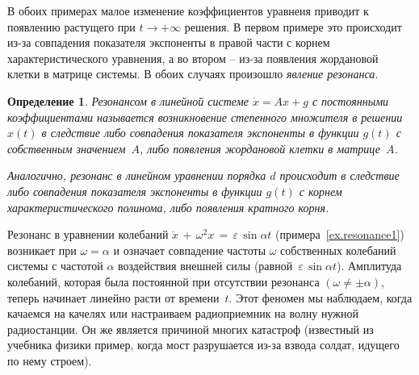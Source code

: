 \documentclass[12pt,a4paper]{article}
\newtheorem{defi}{Определение}
\begin{document}
В обоих примерах малое изменение коэффициентов уравнеия приводит к
появлению растущего при $t\to +\infty$ решения. В первом примере это происходит из-за совпадения
показателя экспоненты в правой части с корнем характеристического уравнения, а во втором -- из-за появления
жордановой клетки в матрице системы. В обоих случаях произошло {\em явление резонанса}.
\begin{defi}\label{d.resonance}
Резонансом в линейной системе $\dot x = Ax + g$ с постоянными коэффициентами называется возникновение степенного множителя в решении~$x(t)$ в следствие либо совпадения показателя экспоненты в функции $g(t)$ с собственным значением~$A$,
либо появления жордановой клетки в  матрице~$A$.

 Аналогично, резонанс в линейном уравнении порядка $d$
 происходит в следствие либо совпадения показателя экспоненты в функции $g(t)$ с корнем характеристического полинома,
либо появления кратного корня.
\end{defi}
Резонанс в уравнении колебаний $\ddot x \, + \, \omega^2 x \, = \, \varepsilon \, \sin \alpha t$
(примера~\ref{ex.resonance1}) возникает при $\omega = \alpha$ и означает совпадение частоты $\omega$ собственных колебаний системы с частотой $\alpha$ воздействия внешней силы (равной~$\varepsilon \, \sin \alpha t$). Амплитуда колебаний, которая была постоянной
при отсутствии резонанса $(\omega \ne \pm \alpha)$, теперь начинает линейно расти от времени~$t$. Этот феномен мы наблюдаем, когда качаемся на качелях или настраиваем радиоприемник на волну нужной радиостанции. Он же является причиной многих катастроф (известный из учебника физики пример, когда мост разрушается из-за взвода солдат, идущего по нему строем).

\smallskip
\end{document}
